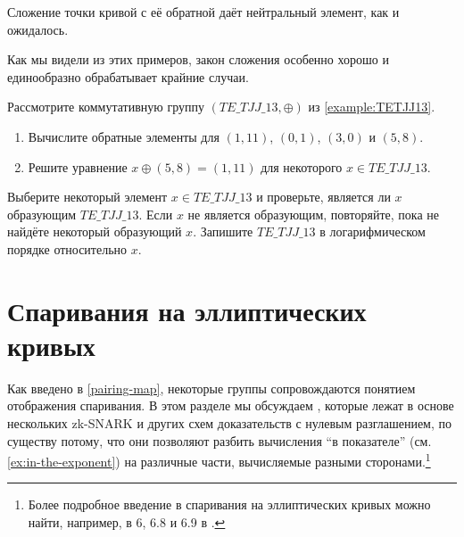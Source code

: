 \begin{example}
Сложение точки кривой с её обратной даёт нейтральный элемент, как и ожидалось. 


Как мы видели из этих примеров, закон сложения  особенно хорошо и единообразно обрабатывает крайние случаи.
\end{example}
\begin{exercise} Рассмотрите коммутативную группу $(TE\_TJJ\_13,\oplus)$ из \examplename{} \ref{example:TETJJ13}.
\begin{enumerate}
\item Вычислите обратные элементы для $(1,11)$, $(0,1)$, $(3,0)$ и $(5,8)$.
\item Решите уравнение $x \oplus (5,8) = (1,11) $ для некоторого $x\in \mathit{TE\_TJJ\_13}$.
\end{enumerate}
Выберите некоторый элемент $x\in \mathit{TE\_TJJ\_13}$ и проверьте, является ли $x$ образующим $\mathit{TE\_TJJ\_13}$. Если $x$ не является образующим, повторяйте, пока не найдёте некоторый образующий $x$. Запишите $\mathit{TE\_TJJ\_13}$ в логарифмическом порядке относительно $x$.
\end{exercise}

\section{Спаривания на эллиптических кривых}
\label{sec:elliptic_curve_pairings}
Как введено в \eqref{pairing-map}, некоторые группы сопровождаются понятием отображения спаривания. В этом разделе мы обсуждаем , которые лежат в основе нескольких zk-SNARK и других схем доказательств с нулевым разглашением, по существу потому, что они позволяют разбить вычисления ``в показателе'' (см. \examplename{} \ref{ex:in-the-exponent}) на различные части, вычисляемые разными сторонами.\footnote{Более подробное введение в спаривания на эллиптических кривых можно найти, например, в \chaptname{} 6, \secname{} 6.8 и 6.9 в \cite{hoffstein-2008}.}


